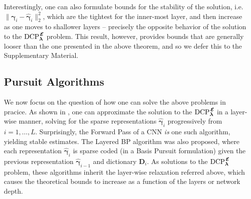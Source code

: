 \documentclass[10pt,journal]{IEEEtran}
\def\v{{\mathbf v}}
\def\y{{\mathbf y}}
\def\D{{\mathbf D}}
\def\M{{\mathcal{M}}}
\def\P{{\mathcal{P}}}
\def\PP{{\mathbf P}}
\def\gama{{\boldsymbol \gamma}}
\def\lamda{{\boldsymbol \lambda}}
\def\vps{{\bm{\mathbf{\mathcal{E}}}}}
\def\DCPE{{\text{DCP}_\lamda^{\hspace{0.04cm} \vps}}}
\def\PM{{\P_{\M_\lamda}}}
\def\pp{{\scriptscriptstyle{\PP}}}
\theoremstyle{plain}
\theoremstyle{definition}
\begin{document}
Interestingly, one can also formulate bounds for the stability of the solution, i.e. \mbox{$\|\gama_i - \hat{\gama}_i\|_2^2$}, which are the tightest for the inner-most layer, and then increase as one moves to shallower layers -- precisely the opposite behavior of the solution to the $\DCPE$ problem. This result, however, provides bounds that are generally looser than the one presented in the above theorem, and so we defer this to the Supplementary Material.


\subsection{Pursuit Algorithms}
\label{sec:Pursuit_Algorithms}

We now focus on the question of how one can solve the above problems in pracice.
As shown in \cite{Papyan2016convolutional}, one can approximate the solution to the $\DCPE$ in a layer-wise manner, solving for the sparse representations $\hat{\gama}_i$ progressively from $i=1,\dots,L$. Surprisingly, the Forward Pass of a CNN \emph{is} one such algorithm, yielding stable estimates. 
The Layered BP algorithm was also proposed, where each representation $\hat{\gama}_i$ is sparse coded (in a Basis Pursuit formulation) given the previous representation $\hat{\gama}_{i-1}$ and dictionary $\D_i$. As solutions to the $\DCPE$ problem, these algorithms inherit the layer-wise relaxation referred above, which causes the theoretical bounds to increase as a function of the layers or network depth.

\end{document}
